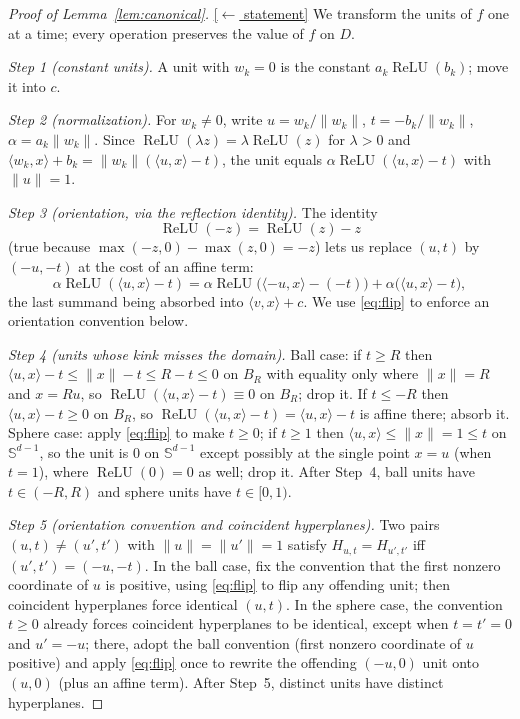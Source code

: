 \documentclass[11pt,reqno]{amsart}
\theoremstyle{plain}
\theoremstyle{definition}
\theoremstyle{remark}
\newcommand{\Sd}{\mathbb{S}^{d-1}}
\newcommand{\relu}{\operatorname{ReLU}}
\newcommand{\inn}[2]{\langle #1,#2\rangle}
\newcommand{\stmtbutton}[1]{\hyperref[#1]{\textnormal{\footnotesize\textsf{[$\leftarrow$ statement]}}}}
\begin{document}
\begin{proof}[Proof of Lemma~\textup{\ref{lem:canonical}}]\label{proof:canonical}\stmtbutton{lem:canonical}
We transform the units of $f$ one at a time; every operation preserves the value of $f$ on $D$.

\emph{Step 1 (constant units).} A unit with $w_k=0$ is the constant $a_k\relu(b_k)$; move it into $c$.

\emph{Step 2 (normalization).} For $w_k\ne0$, write $u=w_k/\|w_k\|$, $t=-b_k/\|w_k\|$, $\alpha=a_k\|w_k\|$. Since $\relu(\lambda z)=\lambda\relu(z)$ for $\lambda>0$ and $\inn{w_k}{x}+b_k=\|w_k\|(\inn{u}{x}-t)$, the unit equals $\alpha\relu(\inn{u}{x}-t)$ with $\|u\|=1$.

\emph{Step 3 (orientation, via the reflection identity).} The identity
\begin{equation}\label{eq:flip}
\relu(-z)=\relu(z)-z
\end{equation}
(true because $\max(-z,0)-\max(z,0)=-z$) lets us replace $(u,t)$ by $(-u,-t)$ at the cost of an affine term:
\[
\alpha\relu(\inn{u}{x}-t)=\alpha\relu\bigl(\inn{-u}{x}-(-t)\bigr)+\alpha\bigl(\inn{u}{x}-t\bigr),
\]
the last summand being absorbed into $\inn{v}{x}+c$. We use \eqref{eq:flip} to enforce an orientation convention below.

\emph{Step 4 (units whose kink misses the domain).} Ball case: if $t\ge R$ then $\inn{u}{x}-t\le\|x\|-t\le R-t\le0$ on $B_R$ with equality only where $\|x\|=R$ and $x=Ru$, so $\relu(\inn{u}{x}-t)\equiv0$ on $B_R$; drop it. If $t\le-R$ then $\inn{u}{x}-t\ge0$ on $B_R$, so $\relu(\inn{u}{x}-t)=\inn{u}{x}-t$ is affine there; absorb it. Sphere case: apply \eqref{eq:flip} to make $t\ge0$; if $t\ge1$ then $\inn{u}{x}\le\|x\|=1\le t$ on $\Sd$, so the unit is $0$ on $\Sd$ except possibly at the single point $x=u$ (when $t=1$), where $\relu(0)=0$ as well; drop it. After Step~4, ball units have $t\in(-R,R)$ and sphere units have $t\in[0,1)$.

\emph{Step 5 (orientation convention and coincident hyperplanes).} Two pairs $(u,t)\ne(u',t')$ with $\|u\|=\|u'\|=1$ satisfy $H_{u,t}=H_{u',t'}$ iff $(u',t')=(-u,-t)$. In the ball case, fix the convention that the first nonzero coordinate of $u$ is positive, using \eqref{eq:flip} to flip any offending unit; then coincident hyperplanes force identical $(u,t)$. In the sphere case, the convention $t\ge0$ already forces coincident hyperplanes to be identical, except when $t=t'=0$ and $u'=-u$; there, adopt the ball convention (first nonzero coordinate of $u$ positive) and apply \eqref{eq:flip} once to rewrite the offending $(-u,0)$ unit onto $(u,0)$ (plus an affine term). After Step~5, distinct units have distinct hyperplanes.


\end{proof}
\end{document}
